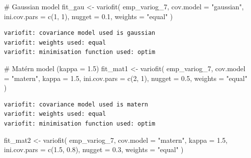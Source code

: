 \documentclass[
  11pt,
]{article}
\newenvironment{Shaded}{\begin{snugshade}}{\end{snugshade}}
\newcommand{\AttributeTok}[1]{\textcolor[rgb]{0.40,0.45,0.13}{#1}}
\newcommand{\CommentTok}[1]{\textcolor[rgb]{0.37,0.37,0.37}{#1}}
\newcommand{\DecValTok}[1]{\textcolor[rgb]{0.68,0.00,0.00}{#1}}
\newcommand{\FloatTok}[1]{\textcolor[rgb]{0.68,0.00,0.00}{#1}}
\newcommand{\FunctionTok}[1]{\textcolor[rgb]{0.28,0.35,0.67}{#1}}
\newcommand{\NormalTok}[1]{\textcolor[rgb]{0.00,0.23,0.31}{#1}}
\newcommand{\OtherTok}[1]{\textcolor[rgb]{0.00,0.23,0.31}{#1}}
\newcommand{\StringTok}[1]{\textcolor[rgb]{0.13,0.47,0.30}{#1}}
\begin{document}
\begin{Shaded}
\begin{Highlighting}[]
\CommentTok{\# Gaussian model}
\NormalTok{fit\_gau }\OtherTok{\textless{}{-}} \FunctionTok{variofit}\NormalTok{(}
\NormalTok{  emp\_variog\_7,}
  \AttributeTok{cov.model =} \StringTok{"gaussian"}\NormalTok{,}
  \AttributeTok{ini.cov.pars =} \FunctionTok{c}\NormalTok{(}\DecValTok{1}\NormalTok{, }\DecValTok{1}\NormalTok{),}
  \AttributeTok{nugget =} \FloatTok{0.1}\NormalTok{,}
  \AttributeTok{weights =} \StringTok{"equal"}
\NormalTok{)}
\end{Highlighting}
\end{Shaded}

\begin{verbatim}
variofit: covariance model used is gaussian 
variofit: weights used: equal 
variofit: minimisation function used: optim 
\end{verbatim}

\begin{Shaded}
\begin{Highlighting}[]
\CommentTok{\# Matérn model (kappa = 1.5)}
\NormalTok{fit\_mat1 }\OtherTok{\textless{}{-}} \FunctionTok{variofit}\NormalTok{(}
\NormalTok{  emp\_variog\_7,}
  \AttributeTok{cov.model =} \StringTok{"matern"}\NormalTok{,}
  \AttributeTok{kappa =} \FloatTok{1.5}\NormalTok{,}
  \AttributeTok{ini.cov.pars =} \FunctionTok{c}\NormalTok{(}\DecValTok{2}\NormalTok{, }\DecValTok{1}\NormalTok{),}
  \AttributeTok{nugget =} \FloatTok{0.5}\NormalTok{,}
  \AttributeTok{weights =} \StringTok{"equal"}
\NormalTok{)}
\end{Highlighting}
\end{Shaded}

\begin{verbatim}
variofit: covariance model used is matern 
variofit: weights used: equal 
variofit: minimisation function used: optim 
\end{verbatim}

\begin{Shaded}
\begin{Highlighting}[]
\NormalTok{fit\_mat2 }\OtherTok{\textless{}{-}} \FunctionTok{variofit}\NormalTok{(}
\NormalTok{  emp\_variog\_7,}
  \AttributeTok{cov.model =} \StringTok{"matern"}\NormalTok{,}
  \AttributeTok{kappa =} \FloatTok{1.5}\NormalTok{,}
  \AttributeTok{ini.cov.pars =} \FunctionTok{c}\NormalTok{(}\FloatTok{1.5}\NormalTok{, }\FloatTok{0.8}\NormalTok{),}
  \AttributeTok{nugget =} \FloatTok{0.3}\NormalTok{,}
  \AttributeTok{weights =} \StringTok{"equal"}
\NormalTok{)}
\end{Highlighting}
\end{Shaded}
\end{document}
